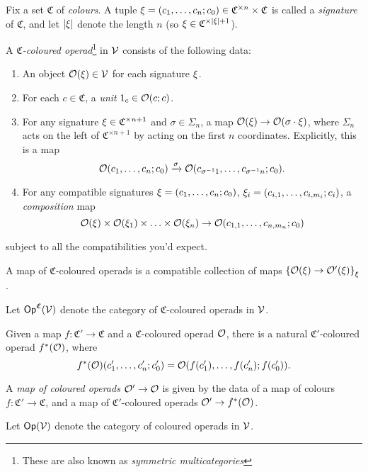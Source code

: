 \documentclass[psamsfonts,onesided,10pt
,draft
]{amsart}%
\begin{document}
\begin{definition}
      Fix a set $\mathfrak C$ of \textit{colours}.
      A tuple
      $\xi = (c_1, \ldots, c_n; c_0) \in \mathfrak C^{\times n} \times \mathfrak C$
      is called a \textit{signature} of $\mathfrak C$, and let $|\xi|$ denote the length $n$
      (so $\xi \in \mathfrak C^{\times |\xi| + 1}$).
      
      A \textit{$\mathfrak C$-coloured operad}\footnote{These are also known as \textit{symmetric multicategories}} in $\mathcal V$ consists of the following data:
      \begin{enumerate}%
      \item An object $\mathcal{O}(\xi) \in \mathcal V$ for each signature $\xi$.
      \item For each $c \in \mathfrak C$, a \textit{unit} $1_c \in \mathcal{O}(c;c)$.
      \item For any signature $\xi \in \mathfrak C^{\times n+1}$ and $\sigma \in \Sigma_n$, a map $\mathcal{O}(\xi) \to \mathcal{O}(\sigma \cdot \xi)$,
            where $\Sigma_n$ acts on the left of $\mathfrak C^{\times n+1}$ by acting on the first $n$ coordinates.
            Explicitly, this is a map
            \begin{equation}
                  \mathcal{O}(c_1, \ldots, c_n; c_0) \xrightarrow{\sigma} \mathcal{O}(c_{\sigma^{-1}1}, \ldots, c_{\sigma^{-1}n}; c_0).
            \end{equation}
      \item For any compatible signatures $\xi = (c_1, \ldots, c_n; c_0)$, $\xi_i = (c_{i,1}, \ldots, c_{i,m_i}; c_i)$, a \textit{composition} map
            \begin{equation}
                  \mathcal{O}(\xi) \times \mathcal{O}(\xi_1) \times \ldots \times \mathcal{O}(\xi_n) \to \mathcal{O}(c_{1,1}, \ldots, c_{n,m_n}; c_0)
            \end{equation}
      \end{enumerate}
      subject to all the compatibilities you'd expect.

      A map of $\mathfrak C$-coloured operads is a compatible collection of maps
      $\left\{\mathcal{O}(\xi) \to \mathcal{O}'(\xi)\right\}_{\xi}$.
      
      Let $\mathsf{Op}^{\mathfrak C}(\mathcal V)$ denote the category of $\mathfrak C$-coloured operads in $\mathcal V$.
\end{definition}

\begin{definition}
      Given a map $f: \mathfrak C' \to \mathfrak C$ and a $\mathfrak C$-coloured operad $\mathcal{O}$,
      there is a natural $\mathfrak C'$-coloured operad $f^*(\mathcal{O})$, where
      \begin{equation}
            f^{\**}(\O)(c'_1, \ldots, c'_n; c'_0) = \O(f(c'_1), \ldots, f(c'_n); f(c'_0)).
      \end{equation}

      A \textit{map of coloured operads} $\mathcal{O}' \to \mathcal{O}$ is given by the data of a map of colours $f: \mathfrak C' \to \mathfrak C$,
      and a map of $\mathfrak C'$-coloured operads $\mathcal{O}' \to f^*(\mathcal{O})$.
      
      Let $\mathsf{Op}(\mathcal V)$ denote the category of coloured operads in $\mathcal V$.
\end{definition}
\end{document}
